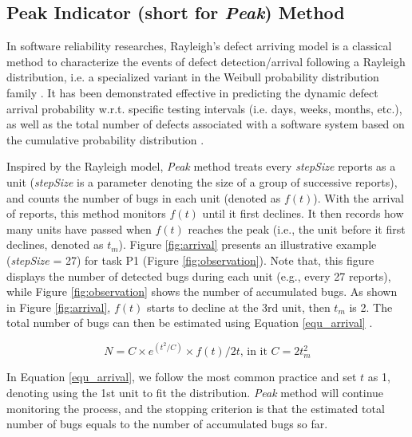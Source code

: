\documentclass[sigconf,review, anonymous]{acmart}
\begin{document}
\subsection{Peak Indicator (short for \textit{Peak}) Method}
\label{subsec:method_Arrival}

In software reliability researches, Rayleigh's defect arriving model is a classical method to characterize the events of defect detection/arrival following a Rayleigh distribution, i.e. a specialized variant in the Weibull probability distribution family \cite{kan2002metrics}. 
It has been demonstrated effective in predicting the dynamic defect arrival probability w.r.t. specific testing intervals (i.e. days, weeks, months, etc.), as well as the total number of defects associated with a software system based on the cumulative probability distribution \cite{kan2002metrics}.


Inspired by the Rayleigh model, \textit{Peak} method treats every \textit{stepSize} reports as a unit (\textit{stepSize} is a parameter denoting the size of a group of successive reports), and counts the number of bugs in each unit (denoted as $f(t)$).  %
With the arrival of reports, this method monitors $f(t)$ until it first declines.
It then records how many units have passed when $f(t)$ reaches the peak (i.e., the unit before it first declines, denoted as $t_m$).
Figure \ref{fig:arrival} presents an illustrative example (\textit{stepSize} = 27) for task P1 (Figure \ref{fig:observation}).
Note that, this figure displays the number of detected bugs during each unit (e.g., every 27 reports), while Figure \ref{fig:observation} shows the number of accumulated bugs.
As shown in Figure \ref{fig:arrival},  $f(t)$ starts to decline at the 3rd unit, then $t_m$ is 2. The total number of bugs can then be estimated using Equation \ref{equ_arrival} \cite{kan2002metrics}.


\begin{equation}\label{equ_arrival}
N = C \times e^{(t^{2}/C)} \times f(t)/2t \mbox{, in it } C = 2 t_m^{2}
\end{equation}

In Equation \ref{equ_arrival}, we follow the most common practice and set $t$ as 1, denoting using the 1st unit to fit the distribution.
\textit{Peak} method will continue monitoring the process, and the stopping criterion is that the estimated total number of bugs equals to the number of accumulated bugs so far. 
\end{document}
